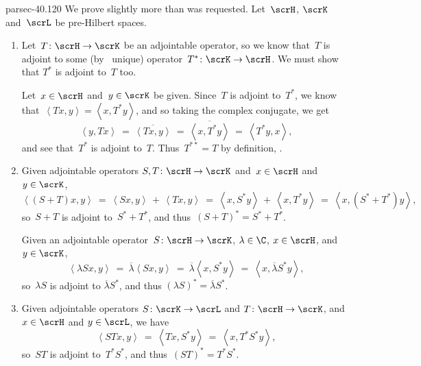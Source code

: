 \documentclass[b5page]{book}
\begin{document}
\begin{solution}{parsec-40.120}%
We prove slightly more than was requested.
Let~$\scrH$, $\scrK$ and~$\scrL$ be pre-Hilbert spaces.
\begin{enumerate}
\item
Let~$T\colon \scrH\to\scrK$ be an adjointable operator,
        so we know that~$T$ is adjoint to some (by~
        unique) operator~$T^*\colon \scrK\to\scrH$.
We must show that $T^*$ is adjoint to~$T$ too.

Let~$x\in\scrH$ and~$y\in\scrK$ be given.
Since~$T$ is adjoint to~$T^*$,
we know that~$\left<Tx,y\right>=\left<x,T^*y\right>$,
and so taking the complex conjugate, we get
        \begin{equation*}
\left<y,Tx\right>\  =\  
    \overline{\left<Tx,y\right>}
    \ =\ 
    \overline{\left<x,T^*y\right>}
    \ =\ \left<T^*y,x\right>,
\end{equation*}
and see that~$T^*$ is adjoint to~$T$.
        Thus~$T^{**}=T$ by definition, .

\item
Given adjointable operators
$S,T\colon \scrH\to\scrK$ 
and~$x\in \scrH$ and $y\in \scrK$,
\begin{equation*}
\left<(S+T)x,y\right>
\ =\  \left<Sx,y\right>\,+\,\left<Tx,y\right>
\ =\ \left<x,S^*y\right>\,+\,\left<x,T^*y\right>
    \ =\ \left<x,(S^*+T^*)y\right>,
\end{equation*}
so~$S+T$ is adjoint to~$S^*+T^*$,
and thus~$(S+T)^*=S^*+T^*$.

Given an adjointable operator~$S\colon \scrH\to\scrK$,
$\lambda\in\C$, $x\in\scrH$, and~$y\in\scrK$,
\begin{equation*}
\left<\lambda Sx,y\right>
\ = \ 
    \overline{\lambda} \left<Sx, y\right>
\ = \ 
    \overline{\lambda} \left<x, S^*y\right>
\ = \ 
     \left<x, \overline{\lambda}S^*y\right>,
\end{equation*}
so~$\lambda S$ is adjoint to $\overline{\lambda}S^*$,
and thus $(\lambda S)^*=\overline{\lambda}S^*$.
\item
Given adjointable operators
$S\colon \scrK\to\scrL$
and $T\colon \scrH\to\scrK$,
and
$x\in\scrH$  and $y\in\scrL$,
we have
\begin{equation*}
\left<STx,y\right>
\ = \ \left<Tx,S^*y\right>
\ = \ \left<x,T^*S^*y\right>,
\end{equation*}
so~$ST$ is adjoint to~$T^*S^*$,
        and thus~$(ST)^*=T^*S^*$.
\end{enumerate}
\end{solution}
\end{document}
